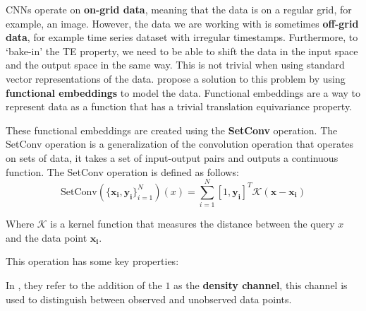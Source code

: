 \documentclass[../../main.tex]{subfiles}
\begin{document}
CNNs operate on \textbf{on-grid data}, meaning that the data is on a regular grid, for example, an image. However, the data we are working with is sometimes \textbf{off-grid data}, for example time series dataset with irregular timestamps. Furthermore, to `bake-in' the TE property, we need to be able to shift the data in the input space and the output space in the same way. This is not trivial when using standard vector representations of the data. \cite{gordon2020convolutional} propose a solution to this problem by using \textbf{functional embeddings} to model the data. Functional embeddings are a way to represent data as a function that has a trivial translation equivariance property. 


These functional embeddings are created using the \textbf{SetConv} operation. The SetConv operation is a generalization of the convolution operation that operates on sets of data, it takes a set of input-output pairs and outputs a continuous function. The SetConv operation is defined as follows:
\begin{equation}
	\text{SetConv}(\{\bm{x_i}, \bm{y_i}\}_{i=1}^{N})(x) = \sum_{i=1}^{N} [1, \bm{y_i}] ^ T \mathcal{K}(\bm{x} - \bm{x_i})
\end{equation}

Where $\mathcal{K}$ is a kernel function that measures the distance between the query $x$ and the data point $\bm{x_i}$.

This operation has some key properties:

In \cite{gordon2020convolutional}, they refer to the addition of the $1$ as the \textbf{density channel}, this channel is used to distinguish between observed and unobserved data points. 
\end{document}
